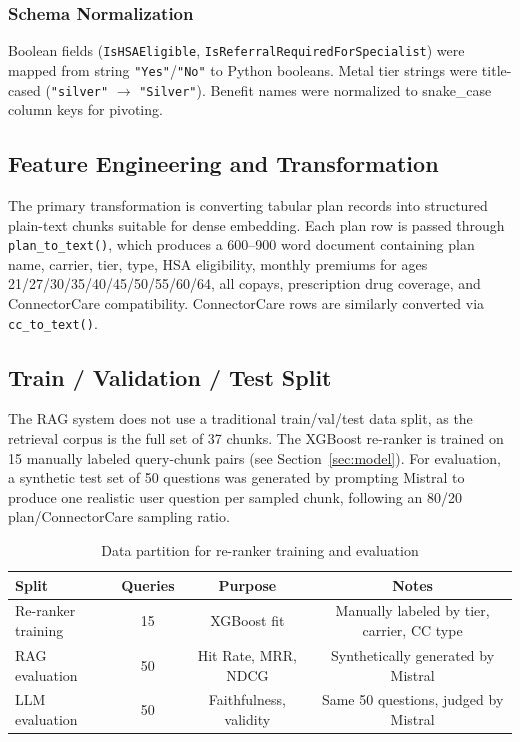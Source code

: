 \documentclass[12pt, letterpaper]{article}
\begin{document}
\subsubsection{Schema Normalization}

Boolean fields (\texttt{IsHSAEligible}, \texttt{IsReferralRequiredForSpecialist}) were mapped from string \texttt{"Yes"}/\texttt{"No"} to Python booleans. Metal tier strings were title-cased (\texttt{"silver"} $\rightarrow$ \texttt{"Silver"}). Benefit names were normalized to snake\_case column keys for pivoting.

\subsection{Feature Engineering and Transformation}

The primary transformation is converting tabular plan records into structured plain-text chunks suitable for dense embedding. Each plan row is passed through \texttt{plan\_to\_text()}, which produces a 600--900 word document containing plan name, carrier, tier, type, HSA eligibility, monthly premiums for ages 21/27/30/35/40/45/50/55/60/64, all copays, prescription drug coverage, and ConnectorCare compatibility. ConnectorCare rows are similarly converted via \texttt{cc\_to\_text()}.

\subsection{Train / Validation / Test Split}

The RAG system does not use a traditional train/val/test data split, as the retrieval corpus is the full set of 37 chunks. The XGBoost re-ranker is trained on 15 manually labeled query-chunk pairs (see Section~\ref{sec:model}). For evaluation, a synthetic test set of 50 questions was generated by prompting Mistral to produce one realistic user question per sampled chunk, following an 80/20 plan/ConnectorCare sampling ratio.

\begin{table}[H]
  \centering
  \caption{Data partition for re-ranker training and evaluation}
  \label{tab:splits}
  \begin{tabular}{lccc}
    \toprule
    \textbf{Split} & \textbf{Queries} & \textbf{Purpose} & \textbf{Notes} \\
    \midrule
    Re-ranker training  & 15 & XGBoost fit & Manually labeled by tier, carrier, CC type \\
    RAG evaluation      & 50 & Hit Rate, MRR, NDCG & Synthetically generated by Mistral \\
    LLM evaluation      & 50 & Faithfulness, validity & Same 50 questions, judged by Mistral \\
    \bottomrule
  \end{tabular}
\end{table}
\end{document}
